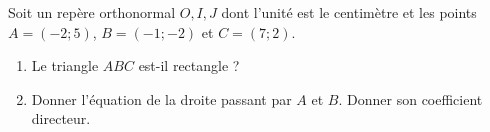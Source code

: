 
\begin{exercice}\label{exoSeconde-0019}

    Soit un repère orthonormal \( O,I,J \) dont l'unité est le centimètre et les points \( A=(-2;5)\), \( B=(-1;-2)\) et \( C=(7;2)\).
    \begin{enumerate}
        \item
            Le triangle \( ABC\) est-il rectangle ?
        \item
            Donner l'équation de la droite passant par \( A\) et \( B\). Donner son coefficient directeur.
    \end{enumerate}

\end{exercice}
